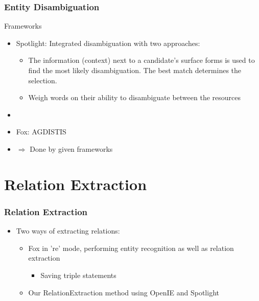 \documentclass{beamer}
\begin{document}
\begin{frame}
\frametitle{Entity Disambiguation}
\begin{block}{Frameworks}
\begin{itemize}
	\item Spotlight: Integrated disambiguation with two approaches: 
	\begin{itemize}
		\item The information (context) next to a candidate's surface forms is used to find the most likely disambiguation. The best match determines the selection.
		\item Weigh words on their ability to disambiguate between the resources
	\end{itemize}
	\item[] \cite{p2}
	\item Fox: AGDISTIS
\end{itemize}
\end{block}
\begin{itemize}
	\item[] $\Rightarrow$ Done by given frameworks
\end{itemize}

\end{frame}


\section{Relation Extraction}

\begin{frame}
\frametitle{Relation Extraction}
\begin{itemize}
	\item Two ways of extracting relations:
	\begin{itemize}
		\item Fox in 're' mode, performing entity recognition as well as relation extraction
		\begin{itemize}
			\item Saving triple statements
		\end{itemize}
		\item Our RelationExtraction method using OpenIE and Spotlight 
	\end{itemize}
\end{itemize}
\end{frame}
\end{document}
